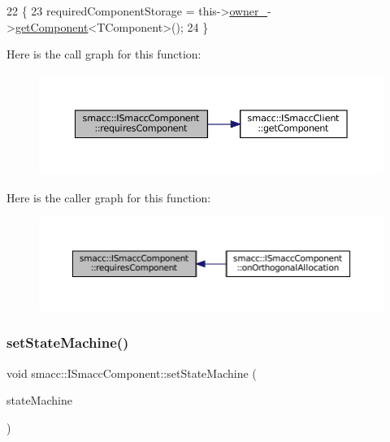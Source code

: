 \begin{DoxyCode}
22     \{
23         requiredComponentStorage = this->\hyperlink{classsmacc_1_1ISmaccComponent_a909590e672450ce0eb0d8facb45c737a}{owner\_}->\hyperlink{classsmacc_1_1ISmaccClient_adef78db601749ca63c19e74a27cb88cc}{getComponent}<TComponent>();
24     \}
\end{DoxyCode}
Here is the call graph for this function\+:
\nopagebreak
\begin{figure}[H]
\begin{center}
\leavevmode
\includegraphics[width=350pt]{classsmacc_1_1ISmaccComponent_aa06d58b1dcec3c513ca2edddfd3847ec_cgraph}
\end{center}
\end{figure}
Here is the caller graph for this function\+:
\nopagebreak
\begin{figure}[H]
\begin{center}
\leavevmode
\includegraphics[width=350pt]{classsmacc_1_1ISmaccComponent_aa06d58b1dcec3c513ca2edddfd3847ec_icgraph}
\end{center}
\end{figure}
\mbox{\label{classsmacc_1_1ISmaccComponent_afe57665a6982475e8f9c2a5885e986e1}} 
\subsubsection{\texorpdfstring{set\+State\+Machine()}{setStateMachine()}}
{\footnotesize\ttfamily void smacc\+::\+I\+Smacc\+Component\+::set\+State\+Machine (\begin{DoxyParamCaption}\item[{\hyperlink{classsmacc_1_1ISmaccStateMachine}{I\+Smacc\+State\+Machine} $\ast$}]{state\+Machine }\end{DoxyParamCaption})\hspace{0.3cm}{\ttfamily [protected]}}



